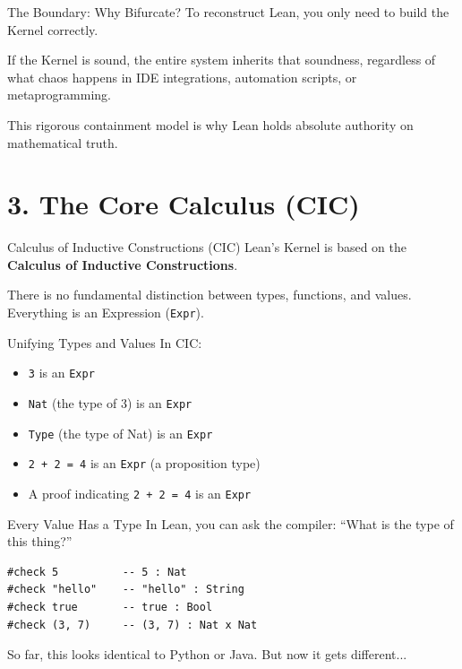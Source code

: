 \documentclass[10pt,aspectratio=169]{beamer}
\begin{document}
\begin{frame}[fragile]{The Boundary: Why Bifurcate?}
    To reconstruct Lean, you only need to build the Kernel correctly. 
    
    If the Kernel is sound, the entire system inherits that soundness, regardless of what chaos happens in IDE integrations, automation scripts, or metaprogramming.
    
    This rigorous containment model is why Lean holds absolute authority on mathematical truth.
\end{frame}

\section{3. The Core Calculus (CIC)}

\begin{frame}[fragile]{Calculus of Inductive Constructions (CIC)}
    Lean's Kernel is based on the \textbf{Calculus of Inductive Constructions}.
    
    There is no fundamental distinction between types, functions, and values. Everything is an Expression (\verb|Expr|).
\end{frame}

\begin{frame}[fragile]{Unifying Types and Values}
    In CIC:
    \begin{itemize}
        \item \verb|3| is an \verb|Expr|
        \item \verb|Nat| (the type of 3) is an \verb|Expr|
        \item \verb|Type| (the type of Nat) is an \verb|Expr|
        \item \verb|2 + 2 = 4| is an \verb|Expr| (a proposition type)
        \item A proof indicating \verb|2 + 2 = 4| is an \verb|Expr|
    \end{itemize}
\end{frame}

\begin{frame}[fragile]{Every Value Has a Type}
    In Lean, you can ask the compiler: ``What is the type of this thing?''
    
    \begin{lstlisting}[language={}]
#check 5          -- 5 : Nat
#check "hello"    -- "hello" : String
#check true       -- true : Bool
#check (3, 7)     -- (3, 7) : Nat x Nat
    \end{lstlisting}
    
    So far, this looks identical to Python or Java. But now it gets different...
\end{frame}
\end{document}
